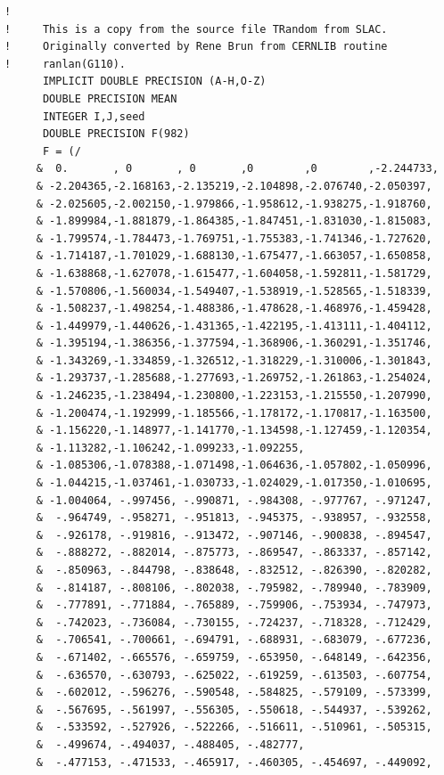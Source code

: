 \begin{lstlisting}
!
!     This is a copy from the source file TRandom from SLAC.
!     Originally converted by Rene Brun from CERNLIB routine 
!     ranlan(G110).
      IMPLICIT DOUBLE PRECISION (A-H,O-Z)
      DOUBLE PRECISION MEAN
      INTEGER I,J,seed
      DOUBLE PRECISION F(982)
      F = (/
     &  0.       , 0       , 0       ,0        ,0        ,-2.244733,
     & -2.204365,-2.168163,-2.135219,-2.104898,-2.076740,-2.050397,
     & -2.025605,-2.002150,-1.979866,-1.958612,-1.938275,-1.918760,
     & -1.899984,-1.881879,-1.864385,-1.847451,-1.831030,-1.815083,
     & -1.799574,-1.784473,-1.769751,-1.755383,-1.741346,-1.727620,
     & -1.714187,-1.701029,-1.688130,-1.675477,-1.663057,-1.650858,
     & -1.638868,-1.627078,-1.615477,-1.604058,-1.592811,-1.581729,
     & -1.570806,-1.560034,-1.549407,-1.538919,-1.528565,-1.518339,
     & -1.508237,-1.498254,-1.488386,-1.478628,-1.468976,-1.459428,
     & -1.449979,-1.440626,-1.431365,-1.422195,-1.413111,-1.404112,
     & -1.395194,-1.386356,-1.377594,-1.368906,-1.360291,-1.351746,
     & -1.343269,-1.334859,-1.326512,-1.318229,-1.310006,-1.301843,
     & -1.293737,-1.285688,-1.277693,-1.269752,-1.261863,-1.254024,
     & -1.246235,-1.238494,-1.230800,-1.223153,-1.215550,-1.207990,
     & -1.200474,-1.192999,-1.185566,-1.178172,-1.170817,-1.163500,
     & -1.156220,-1.148977,-1.141770,-1.134598,-1.127459,-1.120354,
     & -1.113282,-1.106242,-1.099233,-1.092255,
     & -1.085306,-1.078388,-1.071498,-1.064636,-1.057802,-1.050996,
     & -1.044215,-1.037461,-1.030733,-1.024029,-1.017350,-1.010695,
     & -1.004064, -.997456, -.990871, -.984308, -.977767, -.971247,
     &  -.964749, -.958271, -.951813, -.945375, -.938957, -.932558,
     &  -.926178, -.919816, -.913472, -.907146, -.900838, -.894547,
     &  -.888272, -.882014, -.875773, -.869547, -.863337, -.857142,
     &  -.850963, -.844798, -.838648, -.832512, -.826390, -.820282,
     &  -.814187, -.808106, -.802038, -.795982, -.789940, -.783909,
     &  -.777891, -.771884, -.765889, -.759906, -.753934, -.747973,
     &  -.742023, -.736084, -.730155, -.724237, -.718328, -.712429,
     &  -.706541, -.700661, -.694791, -.688931, -.683079, -.677236,
     &  -.671402, -.665576, -.659759, -.653950, -.648149, -.642356,
     &  -.636570, -.630793, -.625022, -.619259, -.613503, -.607754,
     &  -.602012, -.596276, -.590548, -.584825, -.579109, -.573399,
     &  -.567695, -.561997, -.556305, -.550618, -.544937, -.539262,
     &  -.533592, -.527926, -.522266, -.516611, -.510961, -.505315,
     &  -.499674, -.494037, -.488405, -.482777,
     &  -.477153, -.471533, -.465917, -.460305, -.454697, -.449092,

\end{lstlisting}
